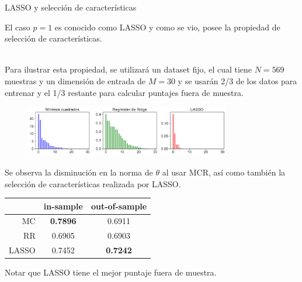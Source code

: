 \documentclass[9pt]{beamer}
\begin{document}
\begin{frame}{LASSO y selección de características}

El caso $p=1$ es conocido como LASSO y como se vio, posee la propiedad de selección de características.\\~\ \pause

Para ilustrar esta propiedad, se utilizará un dataset fijo, el cual tiene $N=569$ muestras y un dimensión de entrada de $M=30$ y se usarán 2/3 de los datos para entrenar y el 1/3 restante para calcular puntajes fuera de muestra. \\

\begin{figure}[H]
	\centering
	\includegraphics[width=0.8\textwidth]{../img/cap2_OLS_RR_LASSO.pdf}
\end{figure} \pause

Se observa la disminución en la norma de $\theta$ al usar MCR, así como también la selección de características realizada por LASSO.\pause

\begin{table}[h]
\centering
	\begin{tabular}{ r|c|c } 
		 & in-sample & out-of-sample \\
		\hline
		MC & \textbf{0.7896} & 0.6911 \\ 
		RR & 0.6905 & 0.6903 \\ 
		LASSO & 0.7452 & \textbf{0.7242}
	\end{tabular}
\end{table}

 Notar que LASSO tiene el mejor puntaje fuera de muestra.

\end{frame}
\end{document}
